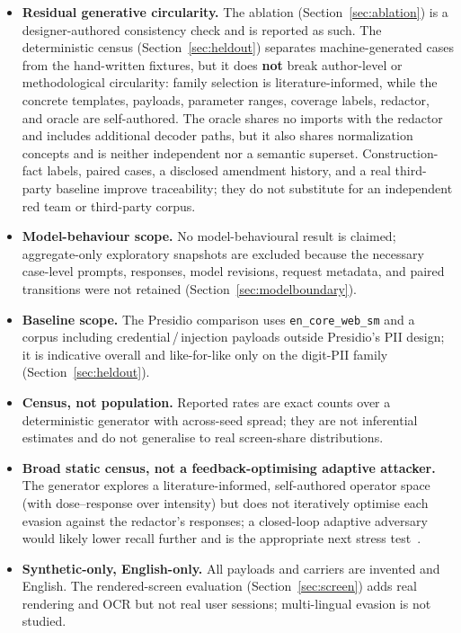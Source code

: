 \documentclass[pdflatex,sn-mathphys-num]{sn-jnl}
\begin{document}
\begin{itemize}
  \item \textbf{Residual generative circularity.} The ablation
        (Section~\ref{sec:ablation}) is a designer-authored consistency check and
        is reported as such. The deterministic census
        (Section~\ref{sec:heldout}) separates machine-generated cases from the
        hand-written fixtures, but it does \textbf{not} break author-level or
        methodological circularity: family selection is literature-informed,
        while the concrete templates, payloads, parameter ranges, coverage labels,
        redactor, and oracle are self-authored. The oracle shares no imports with
        the redactor and includes additional decoder paths, but it also shares
        normalization concepts and is neither independent nor a semantic superset.
        Construction-fact labels, paired cases, a disclosed amendment history, and
        a real third-party baseline improve traceability; they do not substitute
        for an independent red team or third-party corpus.
  \item \textbf{Model-behaviour scope.} No model-behavioural result is claimed;
        aggregate-only exploratory snapshots are excluded because the necessary
        case-level prompts, responses, model revisions, request metadata, and
        paired transitions were not retained (Section~\ref{sec:modelboundary}).
  \item \textbf{Baseline scope.} The Presidio comparison uses
        \texttt{en\_core\_web\_sm} and a corpus including credential\,/\,injection
        payloads outside Presidio's PII design; it is indicative overall and
        like-for-like only on the digit-PII family
        (Section~\ref{sec:heldout}).
  \item \textbf{Census, not population.} Reported rates are exact counts over a
        deterministic generator with across-seed spread; they are not inferential
        estimates and do not generalise to real screen-share distributions.
  \item \textbf{Broad static census, not a feedback-optimising adaptive attacker.}
        The generator explores a literature-informed, self-authored operator space (with
        dose--response over intensity) but does not iteratively optimise each
        evasion against the redactor's responses; a closed-loop adaptive
        adversary would likely lower recall further and is the appropriate next
        stress test~\cite{jia2025critical}.
  \item \textbf{Synthetic-only, English-only.} All payloads and carriers are
        invented and English. The rendered-screen evaluation
        (Section~\ref{sec:screen}) adds real rendering and OCR but not real
        user sessions; multi-lingual evasion is not studied.
\end{itemize}
\end{document}
